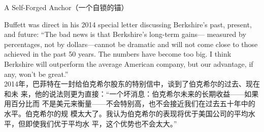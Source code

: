 \begin{section}{A Self-Forged Anchor（一个自锁的锚）}
\begin{verseparallel}
  {
    Buffett was direct in his 2014 special letter discussing Berkshire's past,
    present, and future: ``The bad news is that Berkshire's long-term gains—
    measured by percentages, not by dollars—cannot be dramatic and will not come
    close to those achieved in the past 50 years. The numbers have become too
    big. I think Berkshire will outperform the average American company, but our
    advantage, if any, won't be great.'' \\
  }
  {
    2014年，巴菲特在一封给伯克希尔股东的特别信中，谈到了伯克希尔的过去、现在和未
    来，他的说法则更为直接：“一个坏消息：伯克希尔未来的长期收益——如果用百分比而
    不是美元来衡量——不会特别高，也不会接近我们在过去五十年中的水平。伯克希尔的规
    模太大了。我认为伯克希尔的表现将优于美国公司的平均水平，但即使我们优于平均水
    平，这个优势也不会太大。”
  }
\end{verseparallel}

\end{section}


